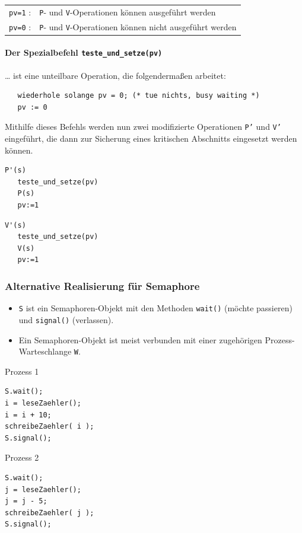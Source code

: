 \documentclass[11pt]{article}
\begin{document}
\begin{center}
\begin{tabular}{ll}
\texttt{pv=1} : & \texttt{P}- und \texttt{V}-Operationen können ausgeführt werden\\
\texttt{pv=0} : & \texttt{P}- und \texttt{V}-Operationen können nicht ausgeführt werden\\
\end{tabular}
\end{center}

\paragraph*{Der Spezialbefehl \texttt{teste\_und\_setze(pv)}}
\label{sec:org1877ef8}
\ldots{} ist eine unteilbare Operation, die folgendermaßen arbeitet:

\begin{verbatim}
   wiederhole solange pv = 0; (* tue nichts, busy waiting *)
   pv := 0
\end{verbatim}

Mithilfe dieses Befehls werden nun zwei modifizierte Operationen \texttt{P’}
und \texttt{V’} eingeführt, die dann zur Sicherung eines kritischen Abschnitts
eingesetzt werden können.

\begin{nebeneinander}
\begin{verbatim}
P'(s)
   teste_und_setze(pv)
   P(s)
   pv:=1
\end{verbatim}
\end{nebeneinander}
\begin{nebeneinander}
\begin{verbatim}
V'(s)
   teste_und_setze(pv)
   V(s)
   pv:=1
\end{verbatim}
\end{nebeneinander}
\begin{clear}
\end{clear}
\subsubsection*{Alternative Realisierung für Semaphore}
\label{sec:orgd56cd15}
\begin{itemize}
\item \texttt{S} ist ein Semaphoren-Objekt mit den Methoden \texttt{wait()} (möchte
passieren) und \texttt{signal()} (verlassen).
\item Ein Semaphoren-Objekt ist meist verbunden mit einer zugehörigen
Prozess-Warteschlange \texttt{W}.
\end{itemize}
\begin{nebeneinander}
Prozess 1
\begin{verbatim}
S.wait();
i = leseZaehler();
i = i + 10; 
schreibeZaehler( i ); 
S.signal();
\end{verbatim}
\end{nebeneinander}
\begin{nebeneinander}
Prozess 2
\begin{verbatim}
S.wait();
j = leseZaehler();
j = j - 5; 
schreibeZaehler( j ); 
S.signal();
\end{verbatim}
\end{nebeneinander}
\begin{clear}
\end{clear}
\end{document}
